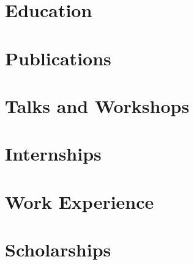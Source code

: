 \documentclass{prometheus_cv}
\begin{document}
\thispagestyle{empty}					%
\pagestyle{fancy}			 		%

\vspace*{-1cm}
\centering


\vspace*{0.15cm}
\section{Education}


\section{Publications}


\section{Talks and Workshops}



\section{Internships}


\section{Work Experience}


\section{Scholarships}

\end{document}
